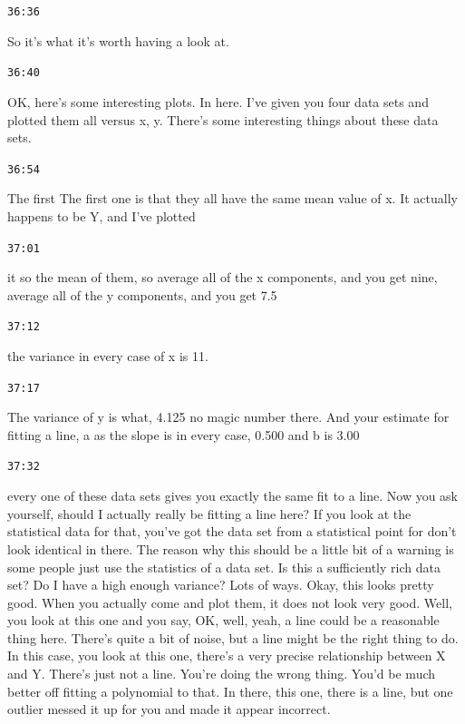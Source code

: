 \documentclass[11pt,a4paper]{article}
\newcommand{\timestamp}[1]{%
  \par\vspace{0.35em}%
  \noindent\colorbox{timestampback}{\textcolor{timestampblue}{\small\texttt{#1}}}%
  \par\vspace{0.2em}%
}
\begin{document}
\timestamp{36:36}

So it's what it's worth having a look at.



\timestamp{36:40}

OK, here's some interesting plots. In here. I've given you four data sets and plotted them all versus x, y. There's some interesting things about these data sets.



\timestamp{36:54}

The first The first one is that they all have the same mean value of x. It actually happens to be Y, and I've plotted



\timestamp{37:01}

it so the mean of them, so average all of the x components, and you get nine, average all of the y components, and you get 7.5



\timestamp{37:12}

the variance in every case of x is 11.



\timestamp{37:17}

The variance of y is what, 4.125 no magic number there. And your estimate for fitting a line, a as the slope is in every case, 0.500 and b is 3.00



\timestamp{37:32}

every one of these data sets gives you exactly the same fit to a line. Now you ask yourself, should I actually really be fitting a line here? If you look at the statistical data for that, you've got the data set from a statistical point for don't look identical in there. The reason why this should be a little bit of a warning is some people just use the statistics of a data set. Is this a sufficiently rich data set? Do I have a high enough variance? Lots of ways. Okay, this looks pretty good. When you actually come and plot them, it does not look very good. Well, you look at this one and you say, OK, well, yeah, a line could be a reasonable thing here. There's quite a bit of noise, but a line might be the right thing to do. In this case, you look at this one, there's a very precise relationship between X and Y. There's just not a line. You're doing the wrong thing. You'd be much better off fitting a polynomial to that. In there, this one, there is a line, but one outlier messed it up for you and made it appear incorrect.
\end{document}
